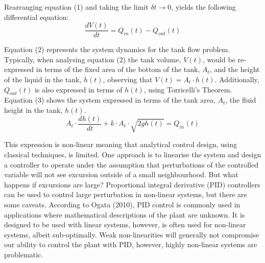 \documentclass{article}
\begin{document}
Rearranging equation (1) and taking the limit $\delta t \to 0$, yields the following differential equation:
\begin{equation}
	\frac{d V(t)}{dt} = Q_{in}(t) - Q_{out}(t)
\end{equation}

Equation (2) represents the system dynamics for the tank flow problem. Typically, when analysing equation (2) the tank volume, $V(t)$, would be re-expressed in terms of the fixed area of the bottom of the tank, $A_t$, and the height of the liquid in the tank, $h(t)$, observing that $V(t) = A_t \cdot h(t)$. Additionally, $Q_{out}(t)$ is also expressed in terms of $h(t)$, using Torricelli's Theorem. Equation (3) shows the system expressed in terms of the tank area, $A_t$, the fluid height in the tank, $h(t)$.
\begin{equation}
	A_t \cdot \frac{d h(t)}{dt} + k \cdot A_t \cdot \sqrt{2gh(t)} = Q_{in}(t)
\end{equation}

This expression is non-linear meaning that analytical control design, using classical techniques, is limited. One approach is to linearise the system and design a controller to operate under the assumption that perturbations of the controlled variable will not see excursion outside of a small neighbourhood. But what happens if excursions are large? Proportional integral derivative (PID) controllers can be used to control large perturbation in non-linear systems, but there are some caveats. According to Ogata (2010), PID control is commonly used in applications where mathematical descriptions of the plant are unknown. It is designed to be used with linear systems, however, is often used for non-linear systems, albeit sub-optimally. Weak non-linearities will generally not compromise our ability to control the plant with PID, however, highly non-linear systems are problematic.
\end{document}
